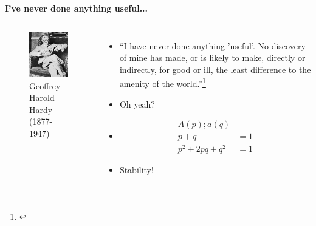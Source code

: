 \begin{frame}[t]{\textbf{I've never done anything useful...}}
\begin{columns}[c]
\column{2.5in}
\begin{figure}[!h]
\begin{center}
\includegraphics[scale=.55]{FIGURES/GHHardy.jpg}
\caption{Geoffrey Harold Hardy (1877-1947)}
\end{center}
\end{figure}
\column{2.5in}
\begin{itemize}
\item ``I have never done anything 'useful'.
No discovery of mine has made, or is likely to make, directly or indirectly, for good or ill, the least difference to the amenity of the world.''\footnote{\tiny\cite{titchmarsh1950}}
\item Oh yeah?\pause
\item[\tikzmark{bl}\textbullet]
\begin{align*}
A(p); a(q) \\
p + q &= 1 \\
p^2 + 2pq + q^2 &= 1 
\end{align*}
\pause
\item Stability!
\end{itemize}
\end{columns}
\end{frame}
